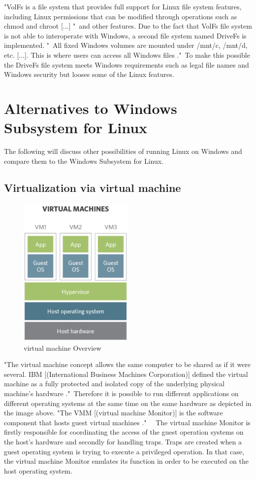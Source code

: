 \documentclass[utf8,biblatex, ngerman, english]{lni}
\begin{document}
"VolFs is a file system that provides full support for Linux file system features, including Linux permissions that can be modified through operations such as chmod and chroot [...] \cite{Ha16b}"\ and other features. Due to the fact that VolFs file system is not able to interoperate with Windows, a second file system named DriveFs is implemented. "\ All fixed Windows volumes are mounted under /mnt/c, /mnt/d, etc. [...]. This is where users can access all Windows files \cite{Ha16b}."\ To make this possible the DriveFs file system meets Windows requirements such as legal file names and Windows security but looses some of the Linux features.

\section{Alternatives to Windows Subsystem for Linux}
The following will discuss other possibilities of running Linux on Windows and compare them to the Windows Subsystem for Linux.

\subsection{Virtualization via virtual machine}

\begin{figure}
  \centering
  \includegraphics[width=0.5\textwidth]{VM.pdf}
  \caption{virtual machine Overview}
  \label{img:vm}
\end{figure}


"The virtual machine concept allows the same computer to be shared as if it were several. IBM [(International Business Machines Corporation)] defined the virtual machine as a fully protected and isolated copy of the underlying physical machine’s hardware \cite[p. 2]{Ro01}."\ 
Therefore it is possible to run different applications on different operating systems at the same time on the same hardware as depicted in the image above. "The VMM [(virtual machine Monitor)] is the software component that hosts guest virtual machines \cite[p. 3]{Ro01}." \ \ The virtual machine Monitor is firstly responsible for coordinating the access of the guest operation systems on the host's hardware and secondly for handling traps. Traps are created when a guest operating system is trying to execute a privileged operation. In that case, the virtual machine Monitor emulates its function in order to be executed on the host operating system.
\end{document}
